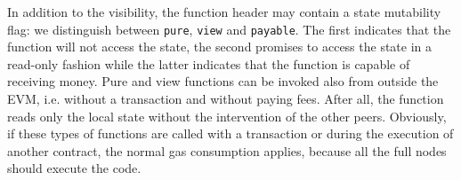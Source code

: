 In addition to the visibility, the function header may contain a state
mutability flag: we distinguish between \texttt{pure}, \texttt{view} and
\texttt{payable}. The first indicates that the function will not access the
state, the second promises to access the state in a read-only fashion while the
latter indicates that the function is capable of receiving money.
Pure and view functions can be invoked also from outside the EVM, i.e. without
a transaction and without paying fees. After all, the function reads only the
local state without the intervention of the other peers.
Obviously, if these types of functions are called with a transaction or during
the execution of another contract, the normal gas consumption applies, because
all the full nodes should execute the code.




